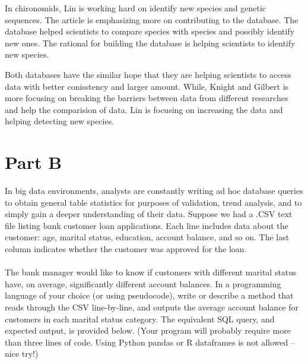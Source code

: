 \documentclass[12pt]{article}
\begin{document}
\begin{enumerate}
        In chironomids, Lin is working hard on identify new species and genetic sequences. The article is emphasizing more on contributing to the database. The database helped scientists to compare species with species and possibly identify new ones. The rational for building the database is helping scientists to identify new species.

        Both databases have the similar hope that they are helping scientists to access data with better conisstency and larger amount. While, Knight and Gilbert is more focusing on breaking the barriers between data from different researches and help the comparision of data. Lin is focusing on increasing the data and helping detecting new species.
    \end{enumerate}

    \section{Part B}
    In big data environments, analysts are constantly writing ad hoc database queries to obtain general table statistics for purposes of validation, trend analysis, and to simply gain a deeper understanding of their data. Suppose we had a .CSV text file listing bank customer loan applications. Each line includes data about the customer: age, marital status, education, account balance, and so on.  The last column indicates whether the customer was approved for the loan. \\ \\
    The bank manager would like to know if customers with different marital status have, on average, significantly different account balances. In a programming language of your choice (or using pseudocode), write or describe a method that reads through the CSV line-by-line, and outputs the average account balance for customers in each marital status category. The equivalent SQL query, and expected output, is provided below.  (Your program will probably require more than three lines of code. Using Python pandas or R dataframes is not allowed – nice try!) 
\end{document}
